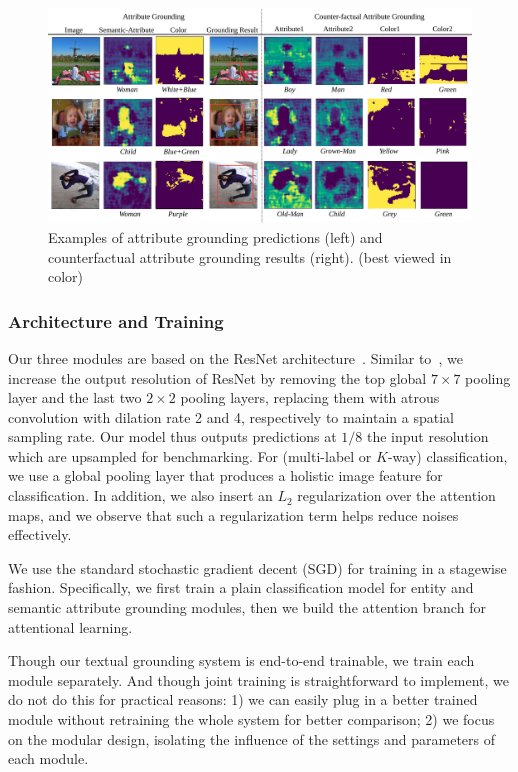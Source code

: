 \begin{figure}[t]
\begin{center}
\includegraphics[width=1.0\linewidth]{images/qualitative.pdf}
\end{center}
\caption{Examples of attribute grounding predictions (left) and counterfactual attribute grounding results (right). (best viewed in color) }
\label{fig:demo}
\end{figure}



\subsubsection{Architecture and Training}
Our three modules are based on the ResNet architecture~\citep{he2016deep}.
Similar to~\citep{chen2018deeplab,kong2017recurrent}, we increase the output resolution of ResNet
by removing the top global $7\times 7$ pooling layer and the last two $2\times2$
pooling layers, replacing them with atrous convolution with dilation rate 2 and
4, respectively to maintain a spatial sampling rate.
Our model thus outputs
predictions at $1/8$ the input resolution which are upsampled for benchmarking.
For (multi-label or $K$-way) classification,
we use a global pooling layer that produces a holistic image feature for classification.
In addition, we also insert an $L_{2}$ regularization over the attention maps,
and we observe that such a regularization term helps reduce noises effectively.

We use the standard stochastic gradient decent (SGD) for training in a stagewise fashion.
Specifically,
we first train a plain classification model for entity and semantic attribute grounding modules,
then we build the attention branch for attentional learning.


Though our textual grounding system is end-to-end trainable,
we train each module separately.
And though joint training is straightforward to implement,
we do not do this for practical reasons:
1) we can easily plug in a better trained module without retraining the whole system
for better comparison; 2) we focus on the modular design,
isolating the influence of the settings and parameters of each module.


